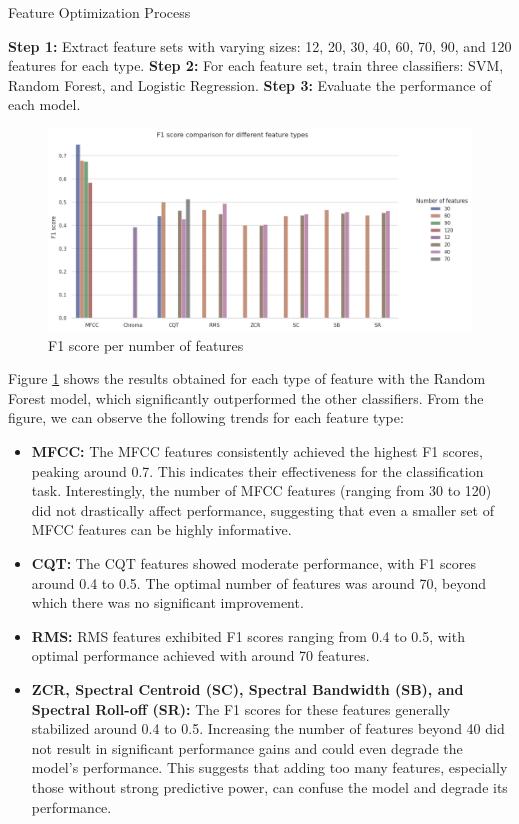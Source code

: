 \begin{algorithm}
    \caption{Feature Optimization Process}
    \begin{algorithmic}[1]
        \State \textbf{Step 1:} Extract feature sets with varying sizes: 12, 20, 30, 40, 60, 70, 90, and 120 features for each type.
        \State \textbf{Step 2:} For each feature set, train three classifiers: SVM, Random Forest,
        and Logistic Regression.
        \State \textbf{Step 3:} Evaluate the performance of each model.
    \end{algorithmic}
\end{algorithm}

\begin{figure}[htbp]
    \centering
    \includegraphics[width=\textwidth]{../images/n_feature_per_type.png}
    \caption{F1 score per number of features}
    \label{fig:n_feature_per_type}
\end{figure}

\noindent
Figure \ref{fig:n_feature_per_type} shows the results obtained for each type of feature with the Random Forest model,
which significantly outperformed the other classifiers.
From the figure, we can observe the following trends for each feature type:
\begin{itemize}
    \item \textbf{MFCC:} The MFCC features consistently achieved the highest F1 scores, peaking around 0.7.
          This indicates their effectiveness for the classification task. Interestingly, the number of MFCC features (ranging from 30 to 120)
          did not drastically affect performance, suggesting that even a smaller set of MFCC features can be highly informative.
    \item \textbf{CQT:} The CQT features showed moderate performance, with F1 scores around 0.4 to 0.5. The optimal number of features was around 70,
          beyond which there was no significant improvement.
    \item \textbf{RMS:} RMS features exhibited F1 scores ranging from 0.4 to 0.5, with optimal performance achieved with around 70 features.
    \item \textbf{ZCR, Spectral Centroid (SC), Spectral Bandwidth (SB), and Spectral Roll-off (SR):}
          The F1 scores for these features generally stabilized around 0.4 to 0.5.
          Increasing the number of features beyond 40 did not result in significant performance gains and could even degrade the model's performance.
          This suggests that adding too many features, especially those without strong predictive power, can confuse the model and degrade its performance.
\end{itemize}
